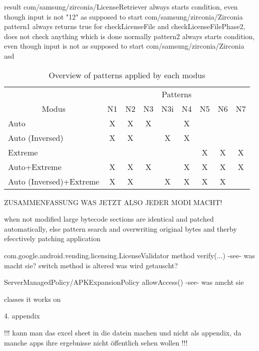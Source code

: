 result
com/samsung/zirconia/LicenseRetriever
always starts condition, even though input is not "12" as supposed to start
com/samsung/zirconia/Zirconia
pattern1
always returns true for checkLicenseFile and checkLicenseFilePhase2, does not check anything which is done normally
pattern2
always starts condition, even though input is not as supposed to start
com/samsung/zirconia/Zirconia
\newline
asd
\begin{table}[h]
\centering
\begin{tabular}{l|cccccccc}
                           & \multicolumn{8}{c}{Patterns}           \\
\multicolumn{1}{c|}{Modus} & N1 & N2 & N3 & N3i & N4 & N5 & N6 & N7 \\ \hline
Auto                       & X  & X  & X  &     & X  &    &    &    \\
Auto (Inversed)            & X  & X  &    & X   & X  &    &    &    \\
Extreme                    &    &    &    &     &    & X  & X  & X  \\
Auto+Extreme               & X  & X  & X  &     & X  & X  & X  & X  \\
Auto (Inversed)+Extreme    & X  & X  &    & X   & X  & X  & X  &
\end{tabular}
\caption{Overview of patterns applied by each modus}
\label{table:patterns}
\end{table}

ZUSAMMENFASSUNG WAS JETZT ALSO JEDER MODI MACHT!



%
when  not modified large bytecode sections are identical and patched automatically, else pattern search and overwriting original bytes and therby efecctively patching application



com.google.android.vending.licensing.LicenseValidator
method verify(...) -see- was macht sie?
switch method is altered
was wird getauscht?


ServerManagedPolicy/APKExpansionPolicy
allowAccess() -see- was amcht sie



\cite{munteanLicense}
%

classes it works on


\cite{samsungZirconia} 4. appendix



!!! kann man das excel sheet in die datein machen und nicht als appendix, da manche apps ihre ergebnisse nicht öffentlich sehen wollen !!!
